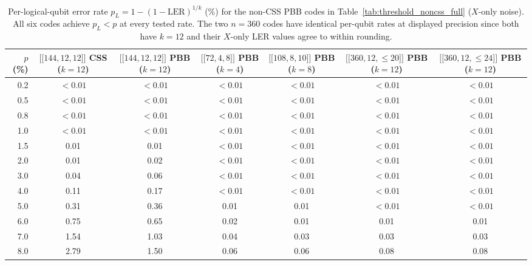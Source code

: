 \documentclass[aps,prxquantum,twocolumn,superscriptaddress,nofootinbib]{revtex4-2}
\newcommand{\dblbrk}[1]{\ensuremath{\lbrack\!\lbrack #1 \rbrack\!\rbrack}}
\newcommand{\code}[1]{\dblbrk{#1}}
\begin{document}
\begin{table}[t]
\centering
\caption{Per-logical-qubit error rate $p_L = 1{-}(1{-}\text{LER})^{1/k}$ (\%) for the non-CSS PBB codes in Table~\ref{tab:threshold_noncss_full} ($X$-only noise).
All six codes achieve $p_L < p$ at every tested rate.
The two $n=360$ codes have identical per-qubit rates at displayed precision since both have $k=12$ and their $X$-only LER values agree to within rounding.}
\label{tab:per_qubit_noncss_full}
\tiny
\setlength{\tabcolsep}{2pt}
\begin{tabular}{r|c|c|c|c|c|c}
\toprule
$p$ (\%) & $\code{144,12,12}$ CSS ($k{=}12$) & $\code{144,12,12}$ PBB ($k{=}12$) & $\code{72,4,8}$ PBB ($k{=}4$) & $\code{108,8,10}$ PBB ($k{=}8$) & $\code{360,12,{\leq}20}$ PBB ($k{=}12$) & $\code{360,12,{\leq}24}$ PBB ($k{=}12$) \\
\midrule
0.2 & ${<}0.01$ & ${<}0.01$ & ${<}0.01$ & ${<}0.01$ & ${<}0.01$ & ${<}0.01$ \\
0.5 & ${<}0.01$ & ${<}0.01$ & ${<}0.01$ & ${<}0.01$ & ${<}0.01$ & ${<}0.01$ \\
0.8 & ${<}0.01$ & ${<}0.01$ & ${<}0.01$ & ${<}0.01$ & ${<}0.01$ & ${<}0.01$ \\
1.0 & ${<}0.01$ & ${<}0.01$ & ${<}0.01$ & ${<}0.01$ & ${<}0.01$ & ${<}0.01$ \\
1.5 & 0.01 & 0.01 & ${<}0.01$ & ${<}0.01$ & ${<}0.01$ & ${<}0.01$ \\
2.0 & 0.01 & 0.02 & ${<}0.01$ & ${<}0.01$ & ${<}0.01$ & ${<}0.01$ \\
3.0 & 0.04 & 0.06 & ${<}0.01$ & ${<}0.01$ & ${<}0.01$ & ${<}0.01$ \\
4.0 & 0.11 & 0.17 & ${<}0.01$ & ${<}0.01$ & ${<}0.01$ & ${<}0.01$ \\
5.0 & 0.31 & 0.36 & 0.01 & 0.01 & ${<}0.01$ & ${<}0.01$ \\
6.0 & 0.75 & 0.65 & 0.02 & 0.01 & 0.01 & 0.01 \\
7.0 & 1.54 & 1.03 & 0.04 & 0.03 & 0.03 & 0.03 \\
8.0 & 2.79 & 1.50 & 0.06 & 0.06 & 0.08 & 0.08 \\
\bottomrule
\end{tabular}
\end{table}
\end{document}
